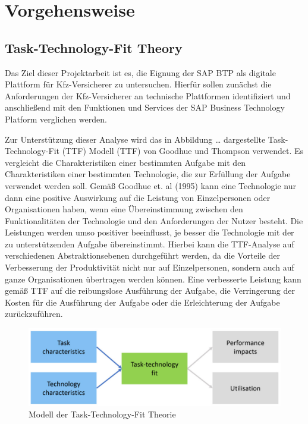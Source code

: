 \clearpage
\chapter{Vorgehensweise}
\section{Task-Technology-Fit Theory}

Das Ziel dieser Projektarbeit ist es, die Eignung der SAP BTP als digitale Plattform für Kfz-Versicherer zu untersuchen. Hierfür sollen zunächst die Anforderungen der Kfz-Versicherer an technische Plattformen identifiziert und anschließend mit den Funktionen und Services der SAP Business Technology Platform verglichen werden.

Zur Unterstützung dieser Analyse wird das in Abbildung …  dargestellte Task-Technology-Fit (TTF) Modell (TTF) von Goodhue und Thompson verwendet. Es vergleicht die Charakteristiken einer bestimmten Aufgabe mit den Charakteristiken einer bestimmten Technologie, die zur Erfüllung der Aufgabe verwendet werden soll. Gemäß Goodhue et. al (1995) kann eine Technologie nur dann eine positive Auswirkung auf die Leistung von Einzelpersonen oder Organisationen haben, wenn eine Übereinstimmung zwischen den Funktionalitäten der Technologie und den Anforderungen der Nutzer besteht. Die Leistungen werden umso positiver beeinflusst, je besser die Technologie mit der zu unterstützenden Aufgabe übereinstimmt. \autocite[Vgl.][S. 214-216]{GOODHUE1995} Hierbei kann die TTF-Analyse auf verschiedenen Abstraktionsebenen durchgeführt werden, da die Vorteile der Verbesserung der Produktivität nicht nur auf Einzelpersonen, sondern auch auf ganze Organisationen übertragen werden können.\autocite[Vgl.][S. 1827f]{GOODHUE1995b} Eine verbesserte Leistung kann gemäß TTF auf die reibungslose Ausführung der Aufgabe, die Verringerung der Kosten für die Ausführung der Aufgabe oder die Erleichterung der Aufgabe zurückzuführen. \autocite[Vgl.][S. 96]{LEE2007}

\autocite[Vgl.][S. 215]{GOODHUE1995}
\autocite[Vgl.][S. 399]{SPIES2020}

\begin{figure}[h]
    \centering
    \includegraphics[width=1\textwidth]{img/TTF_Nadine.jpg}
    \caption[Modell der Task-Technology-Fit Theorie]{Modell der Task-Technology-Fit Theorie\autocite{TTF}}
    \label{fig:TTF}
\end{figure}

